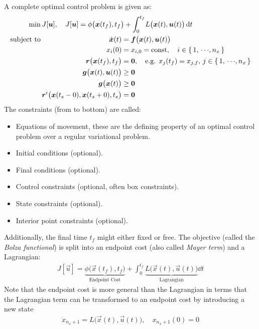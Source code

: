 	A complete optimal control problem is given as:
	\begin{align*}
		\min                & \, J[\bm{u}],\quad J[\bm{u}] = \phi\big(\bm{x}(t_f), t_f\big) + \int_{0}^{t_f} \! L\big(\bm{x}(t), \bm{u}(t)\big) \dd{t} \\
		\mathrm{subject~to} & \,
		\begin{alignedat}[t]{2}
			\dot{\bm{x}}(t) &= \bm{f}\big(\bm{x}(t), \bm{u}(t)\big) \\
			x_i(0) &= x_{i, 0} = \operatorname{const},\quad i \in \{\, 1,\,\cdots\!,n_x \,\} \\
			\bm{r}\big(\bm{x}(t_f), t_f\big) &= \bm{0},\quad \text{e.g. } x_j(t_f) = x_{j, f},\, j \in \{\, 1,\,\cdots\!,n_x \,\} \\
			\bm{g}\big(\bm{x}(t), \bm{u}(t)\big) &\geq \bm{0} \\
			\bm{g}\big(\bm{x}(t)\big) &\geq \bm{0} \\
			\bm{r}^i\big( \bm{x}(t_s - 0), \bm{x}(t_s + 0), t_s \big) &= \bm{0}
		\end{alignedat}
	\end{align*}
	The constraints (from to bottom) are called:
	\begin{itemize}
		\item Equations of movement, these are the defining property of an optimal control problem over a regular variational problem.
		\item Initial conditions (optional).
		\item Final conditions (optional).
		\item Control constraints (optional, often box constraints).
		\item State constraints (optional).
		\item Interior point constraints (optional).
	\end{itemize}
	Additionally, the final time \(t_f\) might either fixed or free. The objective (called the \emph{Bolza functional}) is split into an endpoint cost (also called \emph{Mayer term}) and a Lagrangian:
	\begin{align*}
		J[\vec{u}] = \underbrace{\phi\big(\vec{x}(t_f), t_f\big)}_{\text{Endpoint Cost}}
		+ \int_{0}^{t_f} \! \underbrace{L\big(\vec{x}(t), \vec{u}(t)\big)}_{\text{Lagrangian}} \dd{t}
	\end{align*}
	Note that the endpoint cost is more general than the Lagrangian in terms that the Lagrangian term can be transformed to an endpoint cost by introducing a new state
	\begin{align*}
		\dot{x}_{n_x + 1} = L\big(\vec{x}(t), \vec{u}(t)\big),\quad x_{n_x + 1}(0) = 0
	\end{align*}
